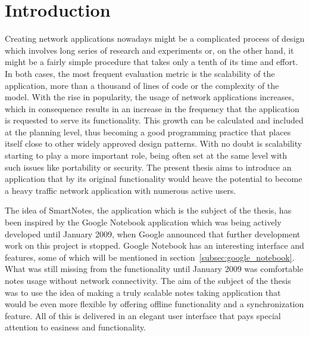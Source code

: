 \chapter{Introduction}
\label{sec:Introduction}
Creating network applications nowadays might be a complicated process of design which involves long series of research and experiments or, on the other hand, it might be a fairly simple procedure that takes only a tenth of its time and effort. In both cases, the most frequent evaluation metric is the scalability of the application, more than a thousand of lines of code or the complexity of the model. With the rise in popularity, the usage of network applications increases, which in consequence results in an increase in the frequency that the application is requested to serve its functionality. This growth can be calculated and included at the planning level, thus becoming a good programming practice that places itself close to other widely approved design patterns. With no doubt is scalability starting to play a more important role, being often set at the same level with such issues like portability or security\cite{scalable_delft}. The present thesis aims to introduce an application that by its original functionality would heave the potential to become a heavy traffic network application with numerous active users. 

The idea of SmartNotes, the application which is the subject of the thesis, has been inspired by the Google Notebook application which was being actively developed until January 2009, when Google announced that further development work on this project is stopped. Google Notebook has an interesting interface and features, some of which will be mentioned in section~\ref{subsec:google_notebook}. What was still missing from the functionality until January 2009 was comfortable notes usage without network connectivity. The aim of the subject of the thesis was to use the idea of making a truly scalable notes taking application that would be even more flexible by offering offline functionality and a synchronization feature. All of this is delivered in an elegant user interface that pays special attention to easiness and functionality.


